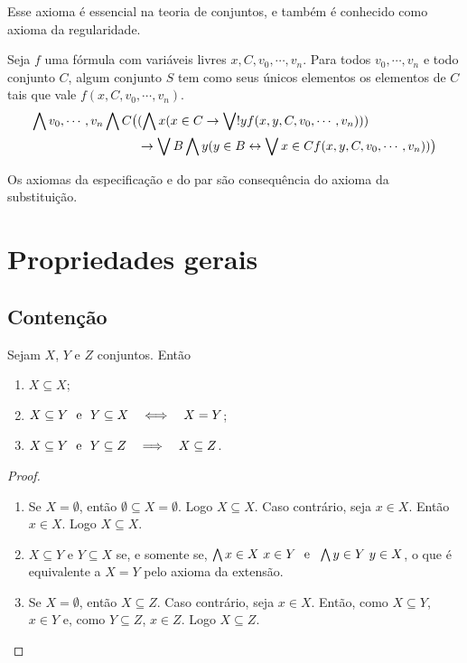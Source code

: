 Esse axioma é essencial na teoria de conjuntos, e também é conhecido como axioma da regularidade.

\begin{axiom}
Seja $f$ uma fórmula com variáveis livres $x,C,v_0,\cdots,v_n$. Para todos $v_0,\cdots,v_n$ e todo conjunto $C$, algum conjunto $S$ tem como seus únicos elementos os elementos de $C$ tais que vale $f(x,C,v_0,\cdots,v_n)$.
	\begin{align*}
		\bigwedge\nolimits v_0,\cdots,v_n \bigwedge\nolimits C \big( & (\bigwedge\nolimits x (x \in C \rightarrow \bigvee\nolimits! y f(x,y,C,v_0,\cdots,v_n))) \\
			&\rightarrow \bigvee\nolimits B \bigwedge\nolimits y (y \in B \leftrightarrow \bigvee\nolimits x \in C f(x,y,C,v_0,\cdots,v_n))\big)
		\end{align*}
\end{axiom}

Os axiomas da especificação e do par são consequência do axioma da substituição.

\section*{Propriedades gerais}

\subsection*{Contenção}

\begin{proposition}
Sejam $X$, $Y$ e $Z$ conjuntos. Então
	\begin{enumerate}
	\item $X \subseteq X$;
	\item $X \subseteq Y \text{\ \ e\ \ } Y \subseteq X \quad \Longleftrightarrow \quad X=Y$;
	\item $X \subseteq Y \text{\ \ e\ \ } Y \subseteq Z \quad \Longrightarrow \quad X \subseteq Z$.
	\end{enumerate}
\end{proposition}
\begin{proof}
	\begin{enumerate}
	\item Se $X=\emptyset$, então $\emptyset \subseteq X = \emptyset$. Logo $X \subseteq X$. Caso contrário, seja $x \in X$. Então $x \in X$. Logo $X \subseteq X$.
	\item $X \subseteq Y$ e $Y \subseteq X$ se, e somente se, $\bigwedge\nolimits x \in X \ x \in Y \text{\ \ e\ \ } \bigwedge\nolimits y \in Y \ y \in X$, o que é equivalente a $X=Y$ pelo axioma da extensão.
	\item Se $X=\emptyset$, então $X \subseteq Z$. Caso contrário, seja $x \in X$. Então, como $X \subseteq Y$, $x \in Y$ e, como $Y \subseteq Z$, $x \in Z$. Logo $X \subseteq Z$.
	\end{enumerate}
\end{proof}

